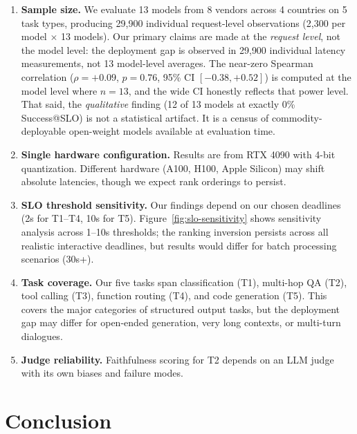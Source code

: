 \documentclass[11pt]{article}
\begin{document}
\begin{enumerate}[leftmargin=12pt]
    \item \textbf{Sample size.} We evaluate 13 models from 8 vendors across 4 countries on 5 task types, producing 29{,}900 individual request-level observations (2{,}300 per model $\times$ 13 models).  Our primary claims are made at the \emph{request level}, not the model level: the deployment gap is observed in 29{,}900 individual latency measurements, not 13 model-level averages.  The near-zero Spearman correlation ($\rho = +0.09$, $p = 0.76$, 95\% CI $[-0.38, +0.52]$) is computed at the model level where $n = 13$, and the wide CI honestly reflects that power level.  That said, the \emph{qualitative} finding (12 of 13 models at exactly 0\% Success@SLO) is not a statistical artifact.  It is a census of commodity-deployable open-weight models available at evaluation time.

    \item \textbf{Single hardware configuration.} Results are from RTX 4090 with 4-bit quantization.  Different hardware (A100, H100, Apple Silicon) may shift absolute latencies, though we expect rank orderings to persist.

    \item \textbf{SLO threshold sensitivity.} Our findings depend on our chosen deadlines (2s for T1--T4, 10s for T5).  Figure~\ref{fig:slo-sensitivity} shows sensitivity analysis across 1--10s thresholds; the ranking inversion persists across all realistic interactive deadlines, but results would differ for batch processing scenarios (30s+).

    \item \textbf{Task coverage.} Our five tasks span classification (T1), multi-hop QA (T2), tool calling (T3), function routing (T4), and code generation (T5).  This covers the major categories of structured output tasks, but the deployment gap may differ for open-ended generation, very long contexts, or multi-turn dialogues.

    \item \textbf{Judge reliability.} Faithfulness scoring for T2 depends on an LLM judge with its own biases and failure modes.
\end{enumerate}


\section{Conclusion}
\label{sec:conclusion}
\end{document}
